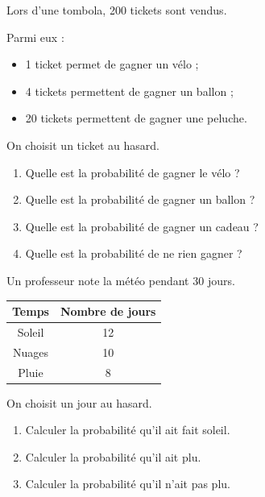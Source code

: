 \documentclass[11pt]{article}
\begin{document}
\begin{exercice}

Lors d'une tombola, 200 tickets sont vendus.

Parmi eux :

\begin{itemize}
    \item 1 ticket permet de gagner un vélo ;
    \item 4 tickets permettent de gagner un ballon ;
    \item 20 tickets permettent de gagner une peluche.
\end{itemize}

On choisit un ticket au hasard.

\begin{enumerate}
    \item Quelle est la probabilité de gagner le vélo ?
    \item Quelle est la probabilité de gagner un ballon ?
    \item Quelle est la probabilité de gagner un cadeau ?
    \item Quelle est la probabilité de ne rien gagner ?
\end{enumerate}

\end{exercice}


\begin{exercice}

Un professeur note la météo pendant 30 jours.

\begin{center}
\begin{tabular}{|c|c|}
\hline
Temps & Nombre de jours \\
\hline
Soleil & 12 \\
Nuages & 10 \\
Pluie & 8 \\
\hline
\end{tabular}
\end{center}

On choisit un jour au hasard.

\begin{enumerate}
    \item Calculer la probabilité qu'il ait fait soleil.
    \item Calculer la probabilité qu'il ait plu.
    \item Calculer la probabilité qu'il n'ait pas plu.
\end{enumerate}

\end{exercice}
\end{document}
